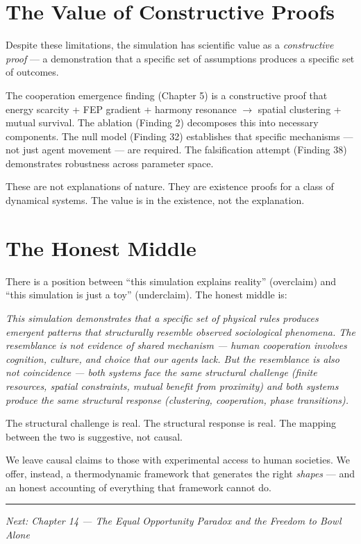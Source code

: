 \section{The Value of Constructive Proofs}\label{the-value-of-constructive-proofs}

Despite these limitations, the simulation has scientific value as a \emph{constructive proof} --- a demonstration that a specific set of assumptions produces a specific set of outcomes.

The cooperation emergence finding (Chapter 5) is a constructive proof that energy scarcity + FEP gradient + harmony resonance $\to$ spatial clustering + mutual survival. The ablation (Finding 2) decomposes this into necessary components. The null model (Finding 32) establishes that specific mechanisms --- not just agent movement --- are required. The falsification attempt (Finding 38) demonstrates robustness across parameter space.

These are not explanations of nature. They are existence proofs for a class of dynamical systems. The value is in the existence, not the explanation.

\section{The Honest Middle}\label{the-honest-middle}

There is a position between ``this simulation explains reality'' (overclaim) and ``this simulation is just a toy'' (underclaim). The honest middle is:

\emph{This simulation demonstrates that a specific set of physical rules produces emergent patterns that structurally resemble observed sociological phenomena. The resemblance is not evidence of shared mechanism --- human cooperation involves cognition, culture, and choice that our agents lack. But the resemblance is also not coincidence --- both systems face the same structural challenge (finite resources, spatial constraints, mutual benefit from proximity) and both systems produce the same structural response (clustering, cooperation, phase transitions).}

The structural challenge is real. The structural response is real. The mapping between the two is suggestive, not causal.

We leave causal claims to those with experimental access to human societies. We offer, instead, a thermodynamic framework that generates the right \emph{shapes} --- and an honest accounting of everything that framework cannot do.

\begin{center}\rule{0.5\linewidth}{0.5pt}\end{center}

\emph{Next: Chapter 14 --- The Equal Opportunity Paradox and the Freedom to Bowl Alone}
